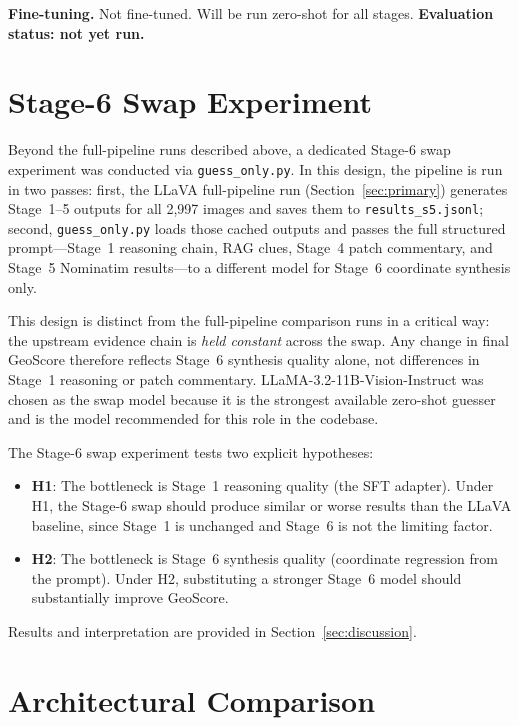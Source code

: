 \documentclass[11pt]{article}
\begin{document}
\textbf{Fine-tuning.} Not fine-tuned. Will be run zero-shot for all stages.
\textbf{Evaluation status: not yet run.}

\section{Stage-6 Swap Experiment}
\label{sec:swap}

Beyond the full-pipeline runs described above, a dedicated Stage-6 swap experiment
was conducted via \texttt{guess\_only.py}. In this design, the pipeline is run in
two passes: first, the LLaVA full-pipeline run (Section~\ref{sec:primary}) generates
Stage~1--5 outputs for all 2{,}997 images and saves them to
\texttt{results\_s5.jsonl}; second, \texttt{guess\_only.py} loads those cached
outputs and passes the full structured prompt---Stage~1 reasoning chain, RAG clues,
Stage~4 patch commentary, and Stage~5 Nominatim results---to a different model for
Stage~6 coordinate synthesis only.

This design is distinct from the full-pipeline comparison runs in a critical way:
the upstream evidence chain is \emph{held constant} across the swap. Any change in
final GeoScore therefore reflects Stage~6 synthesis quality alone, not differences
in Stage~1 reasoning or patch commentary. LLaMA-3.2-11B-Vision-Instruct was chosen
as the swap model because it is the strongest available zero-shot guesser and is
the model recommended for this role in the codebase.

The Stage-6 swap experiment tests two explicit hypotheses:
\begin{itemize}[noitemsep]
  \item \textbf{H1}: The bottleneck is Stage~1 reasoning quality (the SFT adapter).
    Under H1, the Stage-6 swap should produce similar or worse results than the
    LLaVA baseline, since Stage~1 is unchanged and Stage~6 is not the limiting factor.
  \item \textbf{H2}: The bottleneck is Stage~6 synthesis quality (coordinate
    regression from the prompt). Under H2, substituting a stronger Stage~6 model
    should substantially improve GeoScore.
\end{itemize}
Results and interpretation are provided in Section~\ref{sec:discussion}.

\section{Architectural Comparison}
\end{document}
